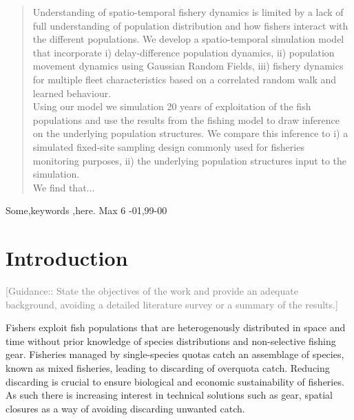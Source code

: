 \documentclass[review]{elsarticle}
\begin{document}
\begin{frontmatter}
\begin{abstract}
Understanding of spatio-temporal fishery dynamics is limited by a lack of full
understanding of population distribution and how fishers interact with the
different populations. We develop a spatio-temporal simulation model that
incorporate i) delay-difference population dynamics, ii) population movement
dynamics using Gaussian Random Fields, iii) fishery dynamics for multiple fleet
characteristics based on a correlated random walk and learned behaviour. \\

Using our model we simulation 20 years of exploitation of the fish populations
and use the results from the fishing model to draw inference on the underlying
population structures.  We compare this inference to i) a simulated fixed-site
sampling design commonly used for fisheries monitoring purposes, ii) the
underlying population structures input to the simulation.\\

We find that... \\

\end{abstract}

\begin{keyword}
Some\sep keywords \sep here. Max 6 
-01\sep  99-00
\end{keyword}

\end{frontmatter}

\linenumbers

\section{Introduction}

\textcolor{gray}{[Guidance:: State the objectives of the work and provide an adequate
background, avoiding a detailed literature survey or a summary of the results.]
\\}

Fishers exploit fish populations that are heterogenously distributed in space
and time without prior knowledge of species distributions and non-selective
fishing gear. Fisheries managed by single-species quotas catch an assemblage of
species, known as mixed fisheries, leading to discarding of overquota catch.
Reducing discarding is crucial to ensure biological and economic sustainability
of fisheries. As such there is increasing interest in technical solutions
such as gear, spatial closures as a way of avoiding discarding unwanted catch.
\\
\end{document}
